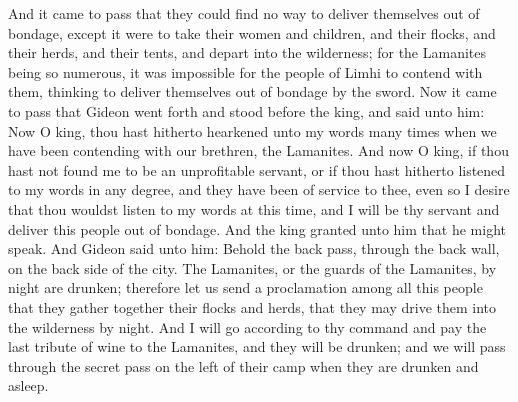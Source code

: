 And it came to pass that they could find no way to deliver themselves out of bondage, except it were to take their women and children, and their flocks, and their herds, and their tents, and depart into the wilderness; for the Lamanites being so numerous, it was impossible for the people of Limhi to contend with them, thinking to deliver themselves out of bondage by the sword.
\bverse \iffalse Now it came to pass that Gideon went forth and stood before the king, and said unto him: Now O king, thou hast hitherto hearkened unto my words many times when we have been contending with our brethren, the Lamanites. \fi
Now it came to pass that Gideon went forth and stood before the king, and said unto him: Now O king, thou hast hitherto hearkened unto my words many times when we have been contending with our brethren, the Lamanites.
\bverse \iffalse And now O king, if thou hast not found me to be an unprofitable servant, or if thou hast hitherto listened to my words in any degree, and they have been of service to thee, even so I desire that thou wouldst listen to my words at this time, and I will be thy servant and deliver this people out of bondage. \fi
And now O king, if thou hast not found me to be an unprofitable servant, or if thou hast hitherto listened to my words in any degree, and they have been of service to thee, even so I desire that thou wouldst listen to my words at this time, and I will be thy servant and deliver this people out of bondage.
\bverse \iffalse And the king granted unto him that he might speak. And Gideon said unto him: \fi
And the king granted unto him that he might speak. And Gideon said unto him:
\bverse \iffalse Behold the back pass, through the back wall, on the back side of the city. The Lamanites, or the guards of the Lamanites, by night are drunken; therefore let us send a proclamation among all this people that they gather together their flocks and herds, that they may drive them into the wilderness by night. \fi
Behold the back pass, through the back wall, on the back side of the city. The Lamanites, or the guards of the Lamanites, by night are drunken; therefore let us send a proclamation among all this people that they gather together their flocks and herds, that they may drive them into the wilderness by night.
\bverse \iffalse And I will go according to thy command and pay the last tribute of wine to the Lamanites, and they will be drunken; and we will pass through the secret pass on the left of their camp when they are drunken and asleep. \fi
And I will go according to thy command and pay the last tribute of wine to the Lamanites, and they will be drunken; and we will pass through the secret pass on the left of their camp when they are drunken and asleep.
